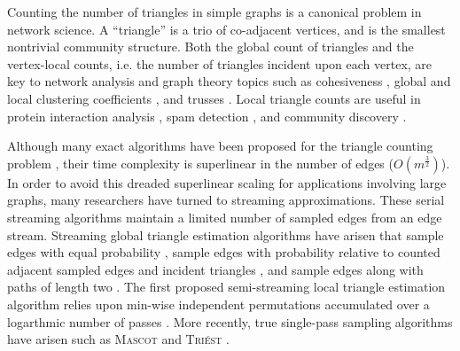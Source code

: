 \documentclass{vldb}
\newcommand{\algoname}[1]{\textnormal{\textsc{#1}}}
\begin{document}

Counting the number of triangles in simple graphs is a canonical problem in network science.
A ``triangle'' is a trio of co-adjacent vertices, and is the smallest nontrivial community structure.
Both the global count of triangles and the vertex-local counts, i.e. the number of triangles incident upon each vertex, are key to network analysis and graph theory topics such as cohesiveness \cite{lim2015mascot}, global and local clustering coefficients \cite{tsourakakis2008fast}, and trusses \cite{cohen2008trusses}.
Local triangle counts are useful in protein interaction analysis \cite{milo2002network},  spam detection \cite{becchetti2010efficient}, and community discovery \cite{wang2010triangulation, berry2011tolerating}.


Although many exact algorithms have been proposed for the triangle counting problem \cite{tsourakakis2008fast, becchetti2010efficient, chu2011triangle, suri2011counting, wolf2017fast}, their time complexity is superlinear in the number of edges ($O(m^{\frac{3}{2}})$).
In order to avoid this dreaded superlinear scaling for applications involving large graphs, many researchers have turned to streaming approximations.
These serial streaming algorithms  maintain a limited number of sampled edges from an edge stream.
Streaming global triangle estimation algorithms have arisen that sample edges with equal probability \cite{tsourakakis2009doulion}, sample edges with probability relative to counted adjacent sampled edges and incident triangles \cite{ahmed2017sampling}, and sample edges along with paths of length two \cite{jha2013space}. 
The first proposed semi-streaming local triangle estimation algorithm relies upon min-wise independent permutations accumulated over a logarthmic number of passes \cite{becchetti2008efficient}. 
More recently, true single-pass sampling algorithms have arisen such as \algoname{Mascot} \cite{lim2015mascot}
and \algoname{Tri\'est} \cite{stefani2017triest}.
\end{document}
